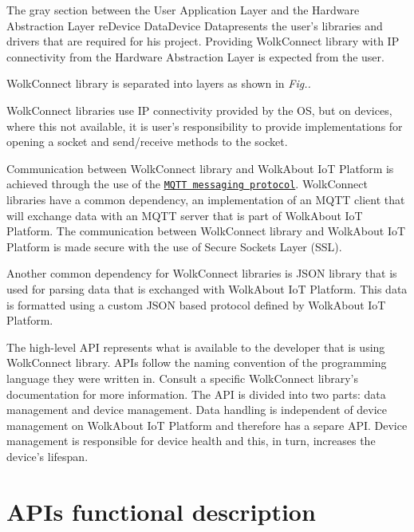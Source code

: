 \begin{center} \end{center} 

The gray section between the User Application Layer and the Hardware Abstraction Layer re\+Device Data\+Device Datapresents the user’s libraries and drivers that are required for his project. Providing Wolk\+Connect library with IP connectivity from the Hardware Abstraction Layer is expected from the user.

Wolk\+Connect library is separated into layers as shown in {\itshape Fig..} \begin{center} \end{center} 

Wolk\+Connect libraries use IP connectivity provided by the OS, but on devices, where this not available, it is user’s responsibility to provide implementations for opening a socket and send/receive methods to the socket.

Communication between Wolk\+Connect library and Wolk\+About IoT Platform is achieved through the use of the \href{http://mqtt.org/}{\tt M\+Q\+TT messaging protocol}. Wolk\+Connect libraries have a common dependency, an implementation of an M\+Q\+TT client that will exchange data with an M\+Q\+TT server that is part of Wolk\+About IoT Platform. The communication between Wolk\+Connect library and Wolk\+About IoT Platform is made secure with the use of Secure Sockets Layer (S\+SL).

Another common dependency for Wolk\+Connect libraries is J\+S\+ON library that is used for parsing data that is exchanged with Wolk\+About IoT Platform. This data is formatted using a custom J\+S\+ON based protocol defined by Wolk\+About IoT Platform.

The high-\/level A\+PI represents what is available to the developer that is using Wolk\+Connect library. A\+P\+Is follow the naming convention of the programming language they were written in. Consult a specific Wolk\+Connect library’s documentation for more information. The A\+PI is divided into two parts\+: data management and device management. Data handling is independent of device management on Wolk\+About IoT Platform and therefore has a separe A\+PI. Device management is responsible for device health and this, in turn, increases the device’s lifespan. 

 \section*{A\+PI\textquotesingle{}s functional description}



